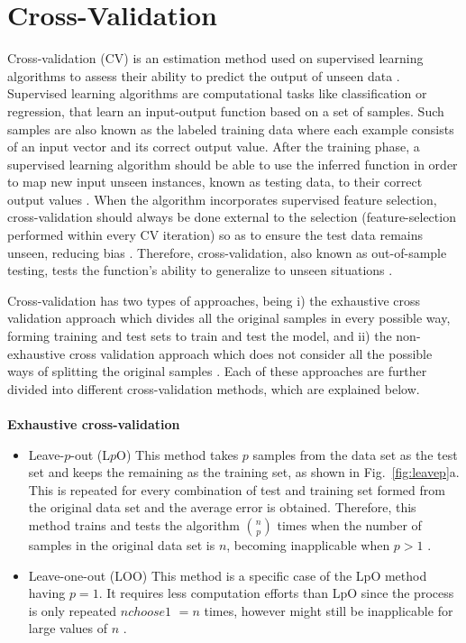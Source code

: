 \chapter{\textit{}Cross-Validation}
\label{ch:cross-validation}

Cross-validation (CV) is an estimation method used on supervised learning algorithms to assess their ability to predict the output of unseen data \cite[-3\baselineskip]{varma2006bias,kohavi1995study}. Supervised learning algorithms are computational tasks like classification or regression, that learn an input-output function based on a set of samples. Such samples are also known as the labeled training data where each example consists of an input vector and its correct output value. After the training phase, a supervised learning algorithm should be able to use the inferred function in order to map new input unseen instances, known as testing data, to their correct output values \cite{caruana2006empirical}. When the algorithm incorporates supervised feature selection, cross-validation should always be done external to the selection (feature-selection performed within every CV iteration) so as to ensure the test data remains unseen, reducing bias \cite[-3\baselineskip]{ambroise2002selection, friedman2001elements}.  Therefore, cross-validation, also known as out-of-sample testing, tests the function's ability to generalize to unseen situations \cite[-3\baselineskip]{varma2006bias,kohavi1995study}. 

Cross-validation has two types of approaches, being i) the exhaustive cross validation approach which divides all the original samples in every possible way, forming training and test sets to train and test the model, and ii) the non-exhaustive cross validation approach which does not consider all the possible ways of splitting the original samples \cite{arlot2010survey}. Each of these approaches are further divided into different cross-validation methods, which are explained below.
\\\\
\noindent\textbf{Exhaustive cross-validation}
\begin{itemize}
\item Leave-$p$-out (L$p$O) \newline {}
This method takes $p$ samples from the data set as the test set and keeps the remaining as the training set, as shown in Fig.~\ref{fig:leavep}a. This is repeated for every combination of test and training set formed from the original data set and the average error is obtained. Therefore, this method trains and tests the algorithm $n\choose p$ times when the number of samples in the original data set is $n$, becoming inapplicable when $p>1$ \cite{arlot2010survey}.

\item Leave-one-out (LOO)\newline {}
This method is a specific case of the LpO method having $p=1$. It requires less computation efforts than LpO since the process is only repeated $n choose 1$ $= n$ times, however might still be inapplicable for large values of $n$ \cite{arlot2010survey}. 
\end{itemize}


